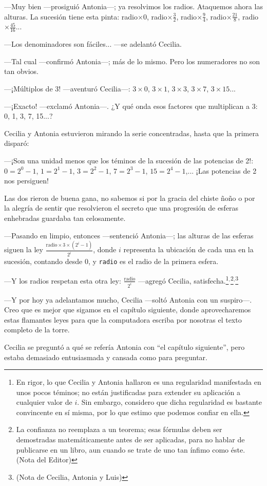  ---Muy bien ---prosiguió Antonia---; ya resolvimos los radios.
 Ataquemos ahora las alturas. La sucesión tiene esta pinta:
 radio$\times0$, radio$\times\frac{3}{2}$, radio$\times\frac{9}{4}$,
 radio$\times\frac{21}{8}$, radio$\times\frac{45}{16}$...

---Los denominadores son fáciles... ---se adelantó Cecilia.

---Tal cual ---confirmó Antonia---; más de lo mismo. Pero los
numeradores no son tan obvios.

---¡Múltiplos de 3! ---aventuró Cecilia---: $3\times 0$, $3\times 1$,
$3\times 3$, $3\times 7$, $3\times 15$...

---¡Exacto! ---exclamó Antonia---. ¿Y qué onda esos factores que
multiplican a 3: 0, 1, 3, 7, 15...?

Cecilia y Antonia estuvieron mirando la serie concentradas, hasta que
la primera disparó:

---¡Son una unidad menos que los téminos de la sucesión de las
potencias de 2!: $0=2^0-1$, $1=2^1-1$, $3=2^2-1$, $7=2^3-1$,
$15=2^4-1$,... ¡Las potencias de 2 nos persiguen!

Las dos rieron de buena gana, no sabemos si por la gracia del chiste
ñoño o por la alegría de sentir que resolvieron el secreto que una
progresión de esferas enhebradas guardaba tan celosamente.

---Pasando en limpio, entonces ---sentenció Antonia---; las alturas de
las esferas siguen la ley
$\frac{\text{radio}\times 3\times (2^i-1)}{2^i}$, donde $i$ representa
la ubicación de cada una en la sucesión, contando desde 0, y
\texttt{radio} es el radio de la primera esfera.

---Y los radios respetan esta otra ley: $\frac{\text{radio}}{2^i}$
---agregó Cecilia, satisfecha.\footnote{En rigor, lo que Cecilia y
  Antonia hallaron es una regularidad manifestada en unos pocos
  téminos; no están justificadas para extender su aplicación a
  cualquier valor de $i$. Sin embargo, considero que dicha regularidad
  es bastante convincente en sí misma, por lo que estimo que podemos
  confiar en ella.}$^,$\footnote{La confianza no reemplaza a un
  teorema; esas fórmulas deben ser demostradas matemáticamente antes
  de ser aplicadas, para no hablar de publicarse en un libro, aun
  cuando se trate de uno tan ínfimo como éste. (Nota del
  Editor)}$^,$\footnote{\Tongey (Nota de Cecilia, Antonia y Luis)}

 
---Y por hoy ya adelantamos mucho, Cecilia ---soltó Antonia con un
suspiro---. Creo que es mejor que sigamos en el capítulo siguiente,
donde aprovecharemos estas flamantes leyes para que la computadora
escriba por nosotras el texto completo de la torre.

Cecilia se preguntó a qué se refería Antonia con ``el capítulo
siguiente'', pero estaba demasiado entusiasmada y cansada como para
preguntar.



